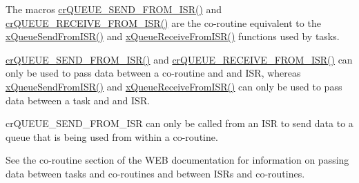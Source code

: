 The macro\textquotesingle{}s \hyperlink{vendor_2ceedling_2plugins_2freertos_2src_2freertos_2include_2croutine_8h_ac8eb0a81c5cf69de7e4edd73ce44a3be}{cr\+Q\+U\+E\+U\+E\+\_\+\+S\+E\+N\+D\+\_\+\+F\+R\+O\+M\+\_\+\+I\+S\+R()} and \hyperlink{vendor_2ceedling_2plugins_2freertos_2src_2freertos_2include_2croutine_8h_a9c0fa977ca69adbddb4811affa2a71f7}{cr\+Q\+U\+E\+U\+E\+\_\+\+R\+E\+C\+E\+I\+V\+E\+\_\+\+F\+R\+O\+M\+\_\+\+I\+S\+R()} are the co-\/routine equivalent to the \hyperlink{externals_2freertos_2include_2queue_8h_a21d5919ed26c21d121df4a4debeb643c}{x\+Queue\+Send\+From\+I\+S\+R()} and \hyperlink{externals_2freertos_2include_2queue_8h_acdf528f5c91131ae2f31c669cfd65758}{x\+Queue\+Receive\+From\+I\+S\+R()} functions used by tasks.

\hyperlink{vendor_2ceedling_2plugins_2freertos_2src_2freertos_2include_2croutine_8h_ac8eb0a81c5cf69de7e4edd73ce44a3be}{cr\+Q\+U\+E\+U\+E\+\_\+\+S\+E\+N\+D\+\_\+\+F\+R\+O\+M\+\_\+\+I\+S\+R()} and \hyperlink{vendor_2ceedling_2plugins_2freertos_2src_2freertos_2include_2croutine_8h_a9c0fa977ca69adbddb4811affa2a71f7}{cr\+Q\+U\+E\+U\+E\+\_\+\+R\+E\+C\+E\+I\+V\+E\+\_\+\+F\+R\+O\+M\+\_\+\+I\+S\+R()} can only be used to pass data between a co-\/routine and and I\+SR, whereas \hyperlink{externals_2freertos_2include_2queue_8h_a21d5919ed26c21d121df4a4debeb643c}{x\+Queue\+Send\+From\+I\+S\+R()} and \hyperlink{externals_2freertos_2include_2queue_8h_acdf528f5c91131ae2f31c669cfd65758}{x\+Queue\+Receive\+From\+I\+S\+R()} can only be used to pass data between a task and and I\+SR.

cr\+Q\+U\+E\+U\+E\+\_\+\+S\+E\+N\+D\+\_\+\+F\+R\+O\+M\+\_\+\+I\+SR can only be called from an I\+SR to send data to a queue that is being used from within a co-\/routine.

See the co-\/routine section of the W\+EB documentation for information on passing data between tasks and co-\/routines and between I\+SR\textquotesingle{}s and co-\/routines.


